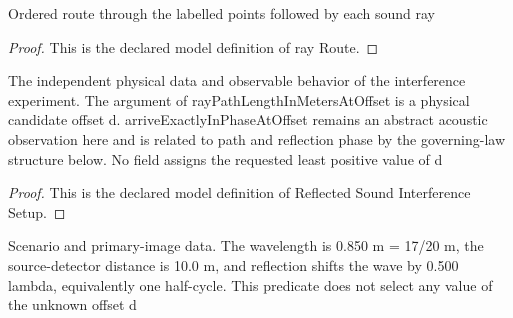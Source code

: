 \begin{definition}
  \label{def:physics:phyx-mini-0323:phyxminiproblems-problemphyxmini0323-rayroute}
  Ordered route through the labelled points followed by each sound ray
\end{definition}
\begin{proof}
  This is the declared model definition of ray Route.
\end{proof}
\begin{definition}
  \label{def:physics:phyx-mini-0323:phyxminiproblems-problemphyxmini0323-reflectedsoundinterferencesetup}
  The independent physical data and observable behavior of the interference experiment. The argument of rayPathLengthInMetersAtOffset is a physical candidate offset d. arriveExactlyInPhaseAtOffset remains an abstract acoustic observation here and is related to path and reflection phase by the governing-law structure below. No field assigns the requested least positive value of d
\end{definition}
\begin{proof}
  This is the declared model definition of Reflected Sound Interference Setup.
\end{proof}
\begin{definition}
  \label{def:physics:phyx-mini-0323:phyxminiproblems-problemphyxmini0323-matchesproblemandfiguredata}
  Scenario and primary-image data. The wavelength is 0.850 m = 17/20 m, the source-detector distance is 10.0 m, and reflection shifts the wave by 0.500 lambda, equivalently one half-cycle. This predicate does not select any value of the unknown offset d
\end{definition}
